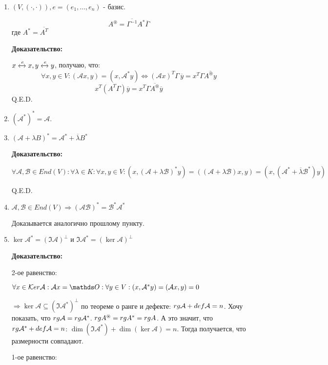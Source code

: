 \begin{enumerate}
    \item $(V, (\cdot, \cdot)), e= (e_1,\ldots, e_n)$ - базис.

$$A^\circledast = \overline{\Gamma^{-1}} A^* \overline{\Gamma}$$
где $A^* = \overline{A^T}$

\textbf{Доказательство:}

$x \xleftrightarrow{e}x, y \xleftrightarrow{e}y$, получаю, что:
$$\forall x,y \in V: (\mathcal{A}x,y) = (x, \mathcal{A}^* y) \Leftrightarrow (\mathcal{A}x)^T \Gamma\, \overline{y} = x^T \Gamma \overline{A^\circledast y} $$
$$x^T (A^T \Gamma)\overline{y}=x^T \Gamma \overline{A^\circledast}\overline{y}$$
\hfill Q.E.D.

\item $(\mathcal{A}^*)^* = \mathcal{\mathcal{A}} $.
\item  $(\mathcal{A} + \lambda B)^* = \mathcal{A}^* +\overline{ \lambda} B^*$

\textbf{Доказательство:}

$\forall \mathcal{A}, \mathcal{B}\in End(V):\forall \lambda \in K:\forall x,y \in V: (x, (\mathcal{A } + \lambda \mathcal{B})^* y) = ((\mathcal{A} + \lambda \mathcal{B})x, y)= (x, (\mathcal{A}^* +\overline{\lambda}\mathcal{B}^* )y)$

\hfill Q.E.D.

\item $\mathcal{A}, \mathcal{B}\in End(V) \Rightarrow (\mathcal{A}\mathcal{B})^* = \mathcal{B}^* \mathcal{A}^*$

Доказывается аналогично прошлому пункту.

\item $\ker \mathcal{A}^* = (\Im \mathcal{A})^\perp$ и $\Im \mathcal{A}^* = (\ker \mathcal{A})^\perp$

\textbf{Доказательство:}

2-ое равенство:

$\forall x \in \ker \mathcal{A}: \mathcal{A}x = \zero : \forall y \in V: (x, \mathcal{A}^*y) = (\mathcal{A}x,y)=0$

$\Rightarrow \ker \mathcal{A} \subseteq (\Im \mathcal{A}^*)^\perp$ по теореме о ранге и дефекте: $rg \mathcal{A} + def \mathcal{A} = n$. Хочу показать, что $rg \mathcal{A} = rg \mathcal{A}^*$. $rg A^\circledast = rg A^* = rg A$. А это значит, что $rg \mathcal{A}^* + def \mathcal{A} = n$: $\dim (\Im \mathcal{A}^*) + \dim (\ker \mathcal{A}) = n$.
Тогда получается, что размерности совпадают.

1-ое равенство:


\end{enumerate}
